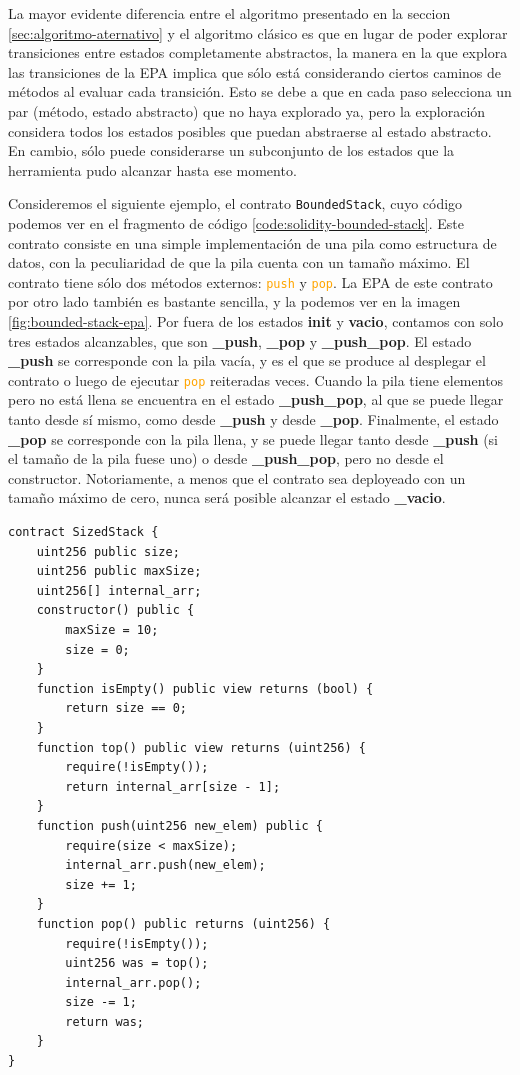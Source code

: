 La mayor evidente diferencia entre el algoritmo presentado en la seccion \ref{sec:algoritmo-aternativo} y el algoritmo clásico es que en lugar de poder explorar transiciones entre estados completamente abstractos, la manera en la que explora las transiciones de la EPA implica que sólo está considerando ciertos caminos de métodos al evaluar cada transición.
Esto se debe a que en cada paso selecciona un par (método, estado abstracto) que no haya explorado ya, pero la exploración considera todos los estados posibles que puedan abstraerse al estado abstracto.
En cambio, sólo puede considerarse un subconjunto de los estados que la herramienta pudo alcanzar hasta ese momento.

Consideremos el siguiente ejemplo, el contrato \texttt{BoundedStack}, cuyo código podemos ver en el fragmento de código \ref{code:solidity-bounded-stack}.
Este contrato consiste en una simple implementación de una pila como estructura de datos, con la peculiaridad de que la pila cuenta con un tamaño máximo.
El contrato tiene sólo dos métodos externos: \textcolor{orange}{\texttt{push}} y \textcolor{orange}{\texttt{pop}}.
La EPA de este contrato por otro lado también es bastante sencilla, y la podemos ver en la imagen \ref{fig:bounded-stack-epa}.
Por fuera de los estados \textbf{init} y \textbf{vacio}, contamos con solo tres estados alcanzables, que son \textbf{\_push}, \textbf{\_pop} y \textbf{\_push\_pop}.
El estado \textbf{\_push} se corresponde con la pila vacía, y es el que se produce al desplegar el contrato o luego de ejecutar \textcolor{orange}{\texttt{pop}} reiteradas veces.
Cuando la pila tiene elementos pero no está llena se encuentra en el estado \textbf{\_push\_pop}, al que se puede llegar tanto desde sí mismo, como desde \textbf{\_push} y desde \textbf{\_pop}.
Finalmente, el estado \textbf{\_pop} se corresponde con la pila llena, y se puede llegar tanto desde \textbf{\_push} (si el tamaño de la pila fuese uno) o desde \textbf{\_push\_pop}, pero no desde el constructor.
Notoriamente, a menos que el contrato sea deployeado con un tamaño máximo de cero, nunca será posible alcanzar el estado \textbf{\_vacio}.

\begin{lstlisting}[language=Solidity, label={code:solidity-bounded-stack}, caption={Contrato Inteligente \texttt{BoundedStack} en Solidity},captionpos=b]
contract SizedStack {
    uint256 public size;
    uint256 public maxSize;
    uint256[] internal_arr;
    constructor() public {
        maxSize = 10;
        size = 0;
    }
    function isEmpty() public view returns (bool) {
        return size == 0;
    }
    function top() public view returns (uint256) {
        require(!isEmpty());
        return internal_arr[size - 1];
    }
    function push(uint256 new_elem) public {
        require(size < maxSize);
        internal_arr.push(new_elem);
        size += 1;
    }
    function pop() public returns (uint256) {
        require(!isEmpty());
        uint256 was = top();
        internal_arr.pop();
        size -= 1;
        return was;
    }
}
\end{lstlisting}


